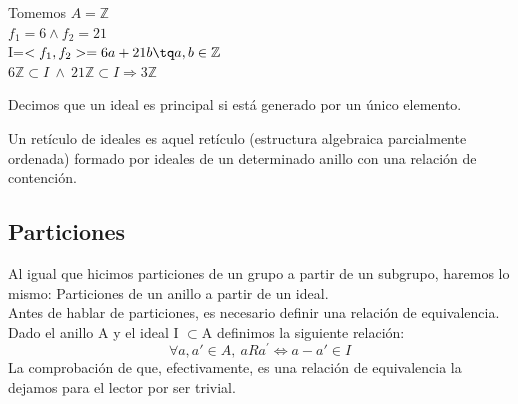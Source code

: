 \documentclass[nochap]{apuntes}
\begin{document}
\begin{example}
 Tomemos $A = \mathbb{Z}$\\
 $f_1=6 \wedge f_2=21$\\
 I=$<f_1,f_2>={6a+21b \tq a,b\in \mathbb{Z}}$\\
 $6\mathbb{Z}\subset I \ \wedge \ 21\mathbb{Z}\subset I \Rightarrow 3\mathbb{Z}$
\end{example}
\begin{defn}[Principal]
 Decimos que un ideal es principal si está generado por un único elemento.
\end{defn}

\begin{defn}
Un retículo de ideales es aquel retículo (estructura algebraica parcialmente ordenada) formado por ideales de un determinado anillo
con una relación de contención.
\end{defn}

\subsection{Particiones}
Al igual que hicimos particiones de un grupo a partir de un subgrupo, haremos lo mismo: Particiones de un anillo a partir de un ideal.\\
Antes de hablar de particiones, es necesario definir una relación de equivalencia.\\
Dado el anillo A y el ideal I $\subset$A definimos la siguiente relación:
\[\forall a, a' \in A, \ aRa^{'} \Leftrightarrow a - a' \in I \]
La comprobación de que, efectivamente, es una relación de equivalencia la dejamos para el lector por ser trivial.\\
\end{document}
